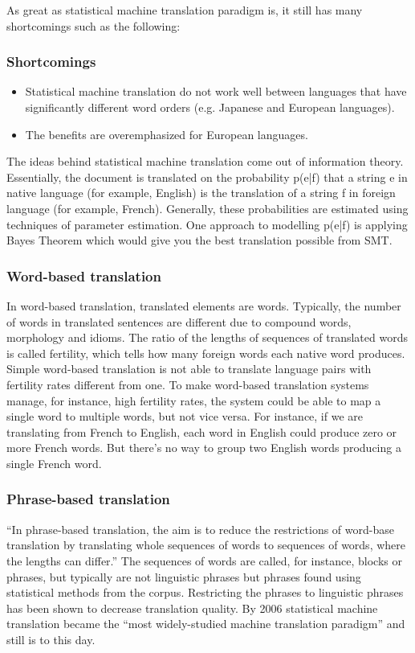 \documentclass[12pt,a4paper]{article}
\begin{document}
As great as statistical machine translation paradigm is, it still has many shortcomings such as the following:
\subsubsection{Shortcomings}
\begin{itemize}
\item Statistical machine translation do not work well between languages that have significantly different word orders (e.g. Japanese and European languages).
\item The benefits are overemphasized for European languages.
\end{itemize}

The ideas behind statistical machine translation come out of information theory. Essentially, the document is translated on the probability p(e|f) that a string e in native language (for example, English) is the translation of a string f in foreign language (for example, French). Generally, these probabilities are estimated using techniques of parameter estimation. 
One approach to modelling p(e|f) is applying Bayes Theorem which would give you the best translation possible from SMT. 

\newpage

\subsubsection{Word-based translation}
In word-based translation, translated elements are words. Typically, the number of words in translated sentences are different due to compound words, morphology and idioms. 
The ratio of the lengths of sequences of translated words is called fertility, which tells how many foreign words each native word produces. Simple word-based translation is not able to translate language pairs with fertility rates different from one. 
To make word-based translation systems manage, for instance, high fertility rates, the system could be able to map a single word to multiple words, but not vice versa. 
For instance, if we are translating from French to English, each word in English could produce zero or more French words. But there's no way to group two English words producing a single French word.

\subsubsection{Phrase-based translation}
“In phrase-based translation, the aim is to reduce the restrictions of word-base translation by translating whole sequences of words to sequences of words, where the lengths can differ.”\cite{SMT Wikipedia}
The sequences of words are called, for instance, blocks or phrases, but typically are not linguistic phrases but phrases found using statistical methods from the corpus. Restricting the phrases to linguistic phrases has been shown to decrease translation quality.
By 2006 statistical machine translation became the “most widely-studied machine translation paradigm”\cite{Translating Directory} and still is to this day. 
\end{document}
